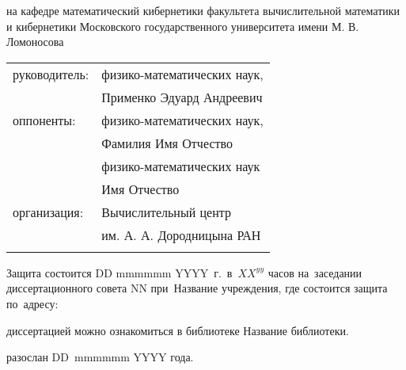  на кафедре математический кибернетики факультета вычислительной математики и кибернетики
Московского государственного университета имени М. В. Ломоносова
\vspace{10mm}
\begin{table} [h]  
  \begin{tabular}{ll}
  \fontsize{14pt}{15pt} руководитель: & \fontsize{14pt}{15pt} физико-математических наук,                     \\
                        & \fontsize{14pt}{15pt} Применко Эдуард Андреевич
\vspace{3mm} \\
  \fontsize{14pt}{15pt} оппоненты:& \fontsize{14pt}{15pt} физико-математических наук,                     \\
                        & \fontsize{14pt}{15pt} Фамилия Имя Отчество \vspace{1mm}         \\
                        & \fontsize{14pt}{15pt} физико-математических наук                    \\
                        & \fontsize{14pt}{15pt} Имя Отчество \vspace{3mm}                \\
  \fontsize{14pt}{15pt} организация:  & \fontsize{14pt}{15pt}\selectfont Вычислительный центр                \\
                        & \fontsize{14pt}{15pt}\selectfont им. А. А. Дородницына РАН                     \\
                        & \fontsize{14pt}{15pt}\selectfont 
  \end{tabular}  
\end{table}

\vspace{20mm}
\noindent Защита состоится DD mmmmmm YYYY~г.~в~$XX^{yy}$ часов на~заседании диссертационного совета $\mbox{NN}$ при~Название учреждения, где состоится защита по~адресу: 

\vspace{15mm}
 диссертацией можно ознакомиться в библиотеке Название библиотеки.

\vspace{15mm}
 разослан DD~mmmmmm YYYY года.

